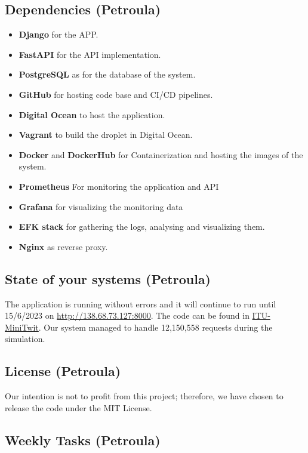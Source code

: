 \documentclass{article}
\begin{document}
    \subsection{Dependencies (Petroula)}
        \begin{itemize}
            \item \textbf{Django} for the APP.
            \item \textbf{FastAPI} for the API implementation.
            \item \textbf{PostgreSQL} as for the database of the system.
            \item \textbf{GitHub} for hosting code base and CI/CD pipelines.
            \item \textbf{Digital Ocean} to host the application.
            \item \textbf{Vagrant} to build the droplet in Digital Ocean.
            \item \textbf{Docker} and \textbf{DockerHub} for Containerization and hosting the images of the system.
            \item \textbf{Prometheus} For monitoring the application and API
            \item \textbf{Grafana} for visualizing the monitoring data
            \item \textbf{EFK stack} for gathering the logs, analysing and visualizing them. 
            \item \textbf{Nginx} as reverse proxy.
        \end{itemize}
    \subsection{State of your systems (Petroula)}
        The application is running without errors and it will continue to run until 15/6/2023 on \href{http://138.68.73.127:8000}{http://138.68.73.127:8000}. The code can be found in \href{https://github.com/szymongalecki/ITU-MiniTwit}{ITU-MiniTwit}. Our system managed to handle 12,150,558 requests during the simulation.
    \subsection{License (Petroula)}
        Our intention is not to profit from this project; therefore, we have chosen to release the code under the MIT License.
    \subsection{Weekly Tasks (Petroula)}
\end{document}
